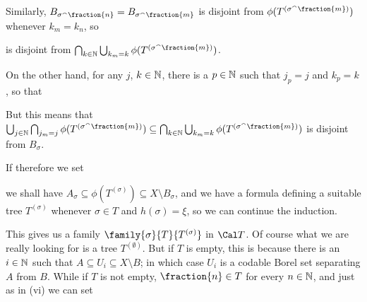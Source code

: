 {

\noindent Similarly,
$B_{\sigma^{\smallfrown}\fraction{n}}=B_{\sigma^{\smallfrown}\fraction{m}}$
is disjoint from
$\phi(T^{(\sigma^{\smallfrown}\fraction{m})})$ whenever
$k_m=k_n$, so


\noindent is disjoint from
$\bigcap_{k\in\Bbb N}\bigcup_{k_m=k}
  \phi(T^{(\sigma^{\smallfrown}\fraction{m})})$.

On the other hand, for any $j$, $k\in\Bbb N$, there is a $p\in\Bbb N$ such
that $j_p=j$ and $k_p=k$, so that


\noindent But this means that
$\bigcup_{j\in\Bbb N}\bigcap_{j_m=j}
   \phi(T^{(\sigma^{\smallfrown}\fraction{m})})
\subseteq\bigcap_{k\in\Bbb N}\bigcup_{k_m=k}
  \phi(T^{(\sigma^{\smallfrown}\fraction{m})})$
is disjoint from $B_{\sigma}$.

If therefore we set


\noindent we shall have
$A_{\sigma}\subseteq\phi(T^{(\sigma)})\subseteq X\setminus B_{\sigma}$, and
we have a formula defining a suitable tree
$T^{(\sigma)}$ whenever $\sigma\in T$ and
$h(\sigma)=\xi$, so we can continue the induction.

\medskip

 This gives us a family
$\family{\sigma}{T}{T^{(\sigma)}}$ in $\Cal T$.
Of course what we are really
looking for is a tree $T^{(\emptyset)}$.   But if $T$ is empty, this is
because there is an $i\in\Bbb N$ such that
$A\subseteq U_i\subseteq X\setminus B$;  in which case $U_i$ is a
codable Borel set separating $A$ from $B$.   While if $T$ is not empty,
$\fraction{n}\in T$ for every $n\in\Bbb N$, and just as in (vi) we can set


}
